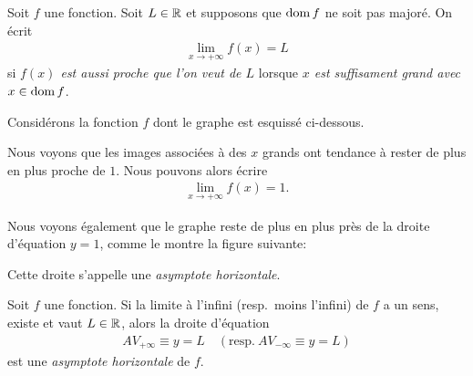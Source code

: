 \documentclass[main.tex]{subfiles}
\begin{document}
\begin{definition}

    Soit $f$ une fonction.
    Soit $L \in \mathbb{R}$ et supposons que $\operatorname{dom} f$ ne soit pas majoré.
    On écrit
    \begin{align}
        \lim_{x \to +\infty} f(x) = L
    \end{align}
    si \emph{$f(x)$ est aussi proche que l'on veut de $L$}
    lorsque \emph{$x$ est suffisament grand avec $x \in \operatorname{dom} f$}.
\end{definition}

\begin{example}

    Considérons la fonction $f$ dont le graphe est esquissé ci-dessous.
    \begin{center}
        \begin{plot}{0.25}{-1}{-3}{30}{5}
        \end{plot}
    \end{center}

    Nous voyons que les images associées à des $x$ grands ont tendance à rester de plus en plus proche de $1$.
    Nous pouvons alors écrire
    \begin{align*}
        \lim_{x \to +\infty} f(x) = 1.
    \end{align*}

    Nous voyons également que le graphe reste de plus en plus près de la droite d'équation $y = 1$,
    comme le montre la figure suivante:
    \begin{center}
        \begin{plot}{0.25}{-1}{-3}{30}{5}
        \end{plot}
    \end{center}

    Cette droite s'appelle une \emph{asymptote horizontale}.
\end{example}

\begin{definition}

    Soit $f$ une fonction.
    Si la limite à l'infini (resp.\ moins l'infini) de $f$ a un sens, existe et vaut $L \in \mathbb{R}$,
    alors la droite d'équation
    \begin{align}
        AV_{+\infty} \equiv y = L
        \quad
        \left(\text{resp.}\ AV_{-\infty} \equiv y = L\right)
    \end{align}
    est une \emph{asymptote horizontale} de $f$.
\end{definition}
\end{document}
